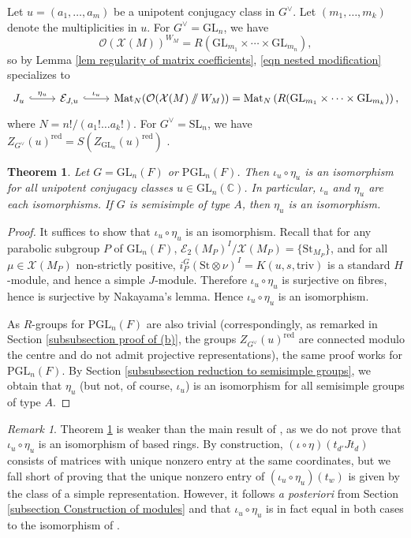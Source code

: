 \documentclass[10pt]{article}
\DeclareMathOperator{\Mat}{Mat}
\newcommand{\git}{\mathbin{
  \mathchoice{/\mkern-6mu/}%
    {/\mkern-6mu/}%
    {/\mkern-5mu/}%
    {/\mkern-5mu/}}}%
\newcommand{\X}{\mathcal{X}}
\newcommand{\Ee}{\mathcal{E}}
\newcommand{\C}{\mathbb{C}}
\newcommand{\Oo}{\mathcal{O}}
\newcommand{\GL}{\mathrm{GL}}
\newcommand{\PGL}{\mathrm{PGL}}
\newcommand{\SL}{\mathrm{SL}}
\newcommand{\St}{\mathrm{St}}
\newcommand{\triv}{\mathrm{triv}}
\newtheorem{theorem}{Theorem}
\theoremstyle{definition}
\theoremstyle{remark}
\newtheorem{rem}{Remark}
\newcommand{\Gd}{G^\vee}
\newcommand{\Zur}{Z_{G^\vee}(u)^{\mathrm{red}}}
\begin{document}
Let $u=(a_1,\dots, a_m)$ be a unipotent conjugacy class in $\Gd$. Let $(m_1,\dots, m_k)$ denote the 
multiplicities in $u$. For $G^\vee=\GL_n$, we have
%
\[
\Oo(\X(M))^{W_M}= R\left(\GL_{m_1}\times\cdots\times\GL_{m_n}\right),
\]
%
so by Lemma \ref{lem regularity of matrix coefficients}, \eqref{eqn nested modification} specializes to 
%
\[
\begin{tikzcd}
J_u\arrow[r, "\eta_{u}", hook]&\mathcal{E}_{J,u}\arrow[r, "\iota_{u}", hook]&
\Mat_{N}(\Oo(\X(M)\git W_M))=
\Mat_{N}\left(R(\GL_{m_1}\times\cdots\times\GL_{m_k})\right),
\end{tikzcd}
\]
%
where $N=n!/(a_1!\dots a_k!)$. For $G^\vee=\SL_n$, we have $\Zur=S(Z_{\GL_n}(u)^{\mathrm{red}})$
\cite[Thm.6.1.3]{CM}.
%
\begin{theorem}
\label{thm Ju matrix algebra for GLn}
Let $G=\GL_n(F)$ or $\PGL_n(F)$. Then $\iota_u\circ\eta_u$ is an isomorphism for all unipotent
conjugacy classes $u\in\GL_n(\C)$. In particular, $\iota_u$ and $\eta_u$ are each isomorphisms.
If $G$ is semisimple of type $A$, then $\eta_u$ is an isomorphism.
\end{theorem}
%
\begin{proof}
It suffices to show that $\iota_u\circ\eta_u$ is an isomorphism.
Recall that for any parabolic subgroup $P$ of $\GL_n(F)$, 
$\Ee_2(M_P)^I/\X(M_P)=\{\St_{M_P}\}$, and for all $\mu\in\X(M_P)$ 
non-strictly positive, $i_P^G(\St\otimes\nu)^I=K(u,s,\triv)$ is a standard $H$-module, and hence 
a simple $J$-module. Therefore $\iota_u\circ\eta_u$ is surjective on fibres, hence is surjective by Nakayama's 
lemma. Hence $\iota_u\circ\eta_u$ is an isomorphism. 

As $R$-groups for $\PGL_n(F)$ are also trivial (correspondingly, as remarked in Section \ref{subsubsection 
proof of (b)}, the groups $\Zur$ are connected modulo the centre and do not admit projective representations),
the same proof works for $\PGL_n(F)$. By Section \ref{subsubsection reduction to semisimple groups},
we obtain that $\eta_u$ (but not, of course, $\iota_u$) is an isomorphism for all semisimple groups
of type $A$.
\end{proof}
%
\begin{rem}
\label{rem isomorphism for GLn is Xi a posteriori}
Theorem \ref{thm Ju matrix algebra for GLn} is weaker than the main result of \cite{XiAMemoir}, as we do not
prove that $\iota_u\circ\eta_u$ is an isomorphism of based rings. By construction,  $(\iota\circ\eta)(t_{d'}Jt_d)$ consists of matrices with unique nonzero entry at the same coordinates, but we fall short of proving that the unique nonzero entry of $(\iota_u\circ\eta_u)(t_w)$ is given by the class of a simple representation. However, it follows \textit{a posteriori}
from Section \ref{subsection Construction of modules} and \cite[Section 10]{cellsIV}  that 
$\iota_u\circ\eta_u$ is in fact equal in both cases to the isomorphism of \cite{XiAMemoir}.
\end{rem}
%
\end{document}
